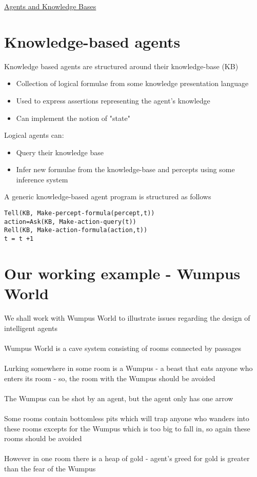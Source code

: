 \documentclass{article}[18pt]
\begin{document}
\begin{center}
\underline{\huge Agents and Knowledge Bases}
\end{center}
\section{Knowledge-based agents}
\begin{defin}
Knowledge based agents are structured around their knowledge-base (KB)
\begin{itemize}
	\item Collection of logical formulae from some knowledge presentation language
	\item Used to express assertions representing the agent's knowledge
	\item Can implement the notion of "state"
\end{itemize}
\end{defin}
Logical agents can:
\begin{itemize}
	\item Query their knowledge base
	\item Infer new formulae from the knowledge-base and percepts using some inference system
\end{itemize}
A generic knowledge-based agent program is structured as follows
\begin{lstlisting}[caption=KB-Agent(percept)]
Tell(KB, Make-percept-formula(percept,t))
action=Ask(KB, Make-action-query(t))
Rell(KB, Make-action-formula(action,t))
t = t +1
\end{lstlisting}
\section{Our working example - Wumpus World}
We shall work with Wumpus World to illustrate issues regarding the design of intelligent agents\\
\\
Wumpus World is a cave system consisting of rooms connected by passages\\
\\
Lurking somewhere in some room is a Wumpus - a beast that eats anyone who enters its room - so, the room with the Wumpus should be avoided\\
\\
The Wumpus can be shot by an agent, but the agent only has one arrow\\
\\
Some rooms contain bottomless pits which will trap anyone who wanders into these rooms excepts for the Wumpus which is too big to fall in, so again these rooms should be avoided\\
\\
However in one room there is a heap of gold - agent's greed for gold is greater than the fear of the Wumpus
\end{document}
